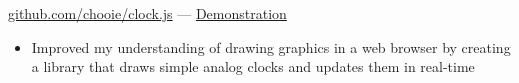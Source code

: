 \href{https://github.com/chooie/clock.js} {github.com/chooie/clock.js} ---
\href {https://chooie.github.io/clock.js} {Demonstration}

\begin{itemize}
\item Improved my understanding of drawing graphics in a web browser by creating
  a library that draws simple analog clocks and updates them in real-time
\end{itemize}

